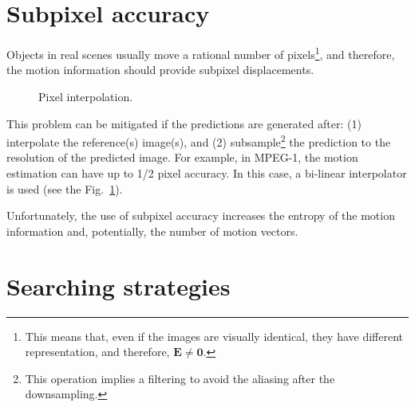 
\section{Subpixel accuracy}

Objects in real scenes usually move a rational number of
pixels\footnote{This means that, even if the images are visually
  identical, they have different representation, and therefore,
  ${\mathbf E}\ne{\mathbf 0}$.}, and therefore, the motion information
should provide subpixel displacements.

\begin{figure}
  \caption{Pixel interpolation.}
  \label{fig:interpolation}
\end{figure}

This problem can be mitigated if the predictions are generated after:
(1) interpolate the reference(s) image(s), and (2)
subsample\footnote{This operation implies a filtering to avoid the
  aliasing after the downsampling.} the prediction to the resolution
of the predicted image. For example, in MPEG-1, the motion estimation
can have up to 1/2 pixel accuracy. In this case, a bi-linear
interpolator is used (see the Fig.~\ref{fig:interpolation}).

Unfortunately, the use of subpixel accuracy increases
the entropy of the motion information and, potentially, the number of
motion vectors.


\section{Searching strategies}

